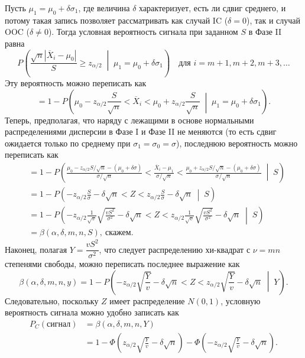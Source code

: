 Пусть \(\mu_1 = \mu_0 + \delta\sigma_1\), где величина \(\delta\) характеризует, есть ли сдвиг среднего, и потому такая запись позволяет рассматривать как случай IC (\(\delta = 0\)), так и случай OOC (\(\delta \ne 0\)). Тогда условная вероятность сигнала при заданном \(S\) в Фазе II равна
\[
	P\left(\frac{\sqrt{n}|\overline{X}_i - \mu_0|}{S} \ge z_{\alpha/2} \;\middle|\; \mu_1 = \mu_0 + \delta\sigma_1\right)
	\quad\text{для } i = m + 1, m + 2, m + 3, \ldots
\]
Эту вероятность можно переписать как
\[
	= 1 - P\left(\mu_0 - z_{\alpha/2}\frac{S}{\sqrt{n}} < \overline{X}_i < \mu_0 + z_{\alpha/2}\frac{S}{\sqrt{n}}
	\;\middle|\; \mu_1 = \mu_0 + \delta\sigma_1\right).
\]
Теперь, предполагая, что наряду с лежащими в основе нормальными распределениями дисперсии в Фазе I и Фазе II не меняются (то есть сдвиг ожидается только по среднему при \(\sigma_1 = \sigma_0 = \sigma\)), последнюю вероятность можно переписать как
\[
\begin{aligned}
	&= 1 - P\left(
	\frac{\mu_0 - z_{\alpha/2}S/\sqrt{n} - (\mu_0 + \delta\sigma)}{\sigma/\sqrt{n}}
	< \frac{\overline{X}_i - \mu_1}{\sigma/\sqrt{n}} <
	\frac{\mu_0 + z_{\alpha/2}S/\sqrt{n} - (\mu_0 + \delta\sigma)}{\sigma/\sqrt{n}}
	\;\middle|\; S\right) \\
	&= 1 - P\left(-z_{\alpha/2}\frac{S}{\sigma} - \delta\sqrt{n} < Z
	< z_{\alpha/2}\frac{S}{\sigma} - \delta\sqrt{n} \;\middle|\; S\right) \\
	&= 1 - P\left(-z_{\alpha/2}\frac{1}{\sqrt{v}}\sqrt{\frac{vS^2}{\sigma^2}} - \delta\sqrt{n} < Z
	< z_{\alpha/2}\frac{1}{\sqrt{v}}\sqrt{\frac{vS^2}{\sigma^2}} - \delta\sqrt{n} \;\middle|\; S\right) \\
	&= \beta(\alpha, \delta, m, n, S),\ \text{скажем}.
\end{aligned}
\]
Наконец, полагая \(Y = \dfrac{vS^2}{\sigma^2}\), что следует распределению хи-квадрат с \(\nu = mn\) степенями свободы, можно переписать последнее выражение как
\[
	\beta(\alpha, \delta, m, n, y) = 1 - P\left(-z_{\alpha/2}\sqrt{\frac{Y}{v}} - \delta\sqrt{n} < Z
	< z_{\alpha/2}\sqrt{\frac{Y}{v}} - \delta\sqrt{n} \;\middle|\; Y\right).
\]
Следовательно, поскольку \(Z\) имеет распределение \(N(0,1)\), условную вероятность сигнала можно удобно записать как
\[
\begin{aligned}
	P_C(\text{сигнал}) &= \beta(\alpha, \delta, m, n, Y) \\
	&= 1 - \Phi\left(z_{\alpha/2}\sqrt{\frac{Y}{v}} - \delta\sqrt{n}\right)
	   - \Phi\left(-z_{\alpha/2}\sqrt{\frac{Y}{v}} - \delta\sqrt{n}\right).
\end{aligned}
\]

